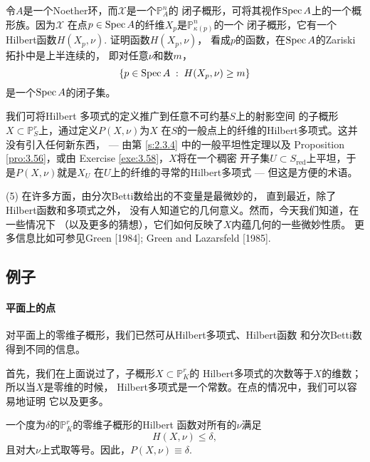 \begin{exe}\label{exe:3.58}
令$A$是一个Noether环，而$\mathscr X$是一个$\mathbb P_A^n$的
闭子概形，可将其视作$\operatorname{Spec} A$上的一个概形族。因为$\mathscr X$
在点$p\in \operatorname{Spec} A$的纤维$X_p$是$\mathbb P_{\kappa(p)}^n$的一个
闭子概形，它有一个Hilbert函数$H(X_p,\nu)$. 证明函数$H(X_p,\nu)$，
看成$p$的函数，在$\operatorname{Spec} A$的Zariski拓扑中是上半连续的，
即对任意$\nu$和数$m$，
\[
	\{p\in \operatorname{Spec} A\;:\; H(X_p,\nu)\geq m\}
\]
是一个$\operatorname{Spec} A$的闭子集。
\end{exe}

我们可将Hilbert 多项式的定义推广到任意不可约基$S$上的射影空间
的子概形$X\subset \mathbb P_S^r$上，通过定义$P(X,\nu)$为$X$
在$S$的一般点上的纤维的Hilbert多项式。这并没有引入任何新东西，
--- 由第 \ref{s:2.3.4} 中的一般平坦性定理以及 Proposition 
\ref{pro:3.56}，或由 Exercise \ref{exe:3.58}，$X$将在一个稠密
开子集$U\subset S_{\text{red}}$上平坦，于是$P(X,\nu)$就是$X_U$
在$U$上的纤维的寻常的Hilbert多项式 --- 但这是方便的术语。

(5) 在许多方面，由分次Betti数给出的不变量是最微妙的，
直到最近，除了Hilbert函数和多项式之外，
没有人知道它的几何意义。然而，今天我们知道，在一些情况下
（以及更多的猜想），它们如何反映了$X$内蕴几何的一些微妙性质。
更多信息比如可参见Green [1984]; Green and Lazarsfeld [1985].

\subsection{例子}\label{s:3.3.4}
\paragraph*{平面上的点}
对平面上的零维子概形，我们已然可从Hilbert多项式、Hilbert函数
和分次Betti数得到不同的信息。

首先，我们在上面说过了，子概形$X\subset \mathbb P_K^r$的
Hilbert多项式的次数等于$X$的维数；所以当$X$是零维的时候，
Hilbert多项式是一个常数。在点的情况中，我们可以容易地证明
它以及更多。

\begin{pro}\label{pro:3.59}
  一个度为$\delta$的$\mathbb P_K^r$的零维子概形的Hilbert
  函数对所有的$\nu$满足
  \[H(X,\nu)\leq \delta,\]
  且对大$\nu$上式取等号。因此，$P(X,\nu)\equiv \delta$.
\end{pro}

